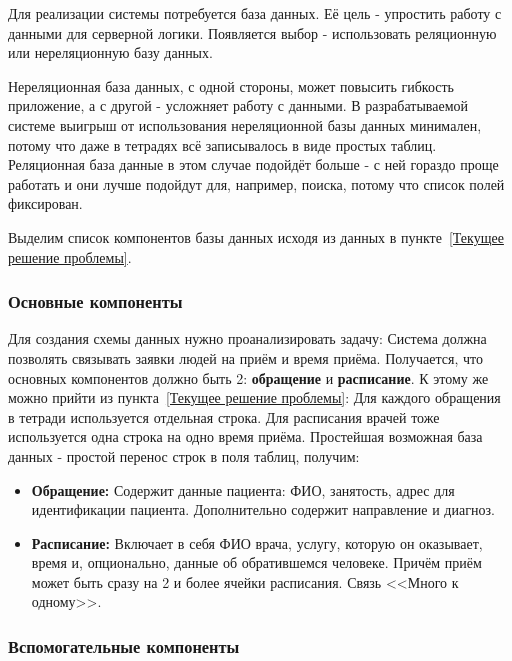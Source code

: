 \documentclass[a4paper,article]{article}
\begin{document}
    Для реализации системы потребуется база данных. Её цель - упростить работу с данными для серверной логики. Появляется выбор - использовать реляционную или нереляционную базу данных.

    Нереляционная база данных, с одной стороны, может повысить гибкость приложение, а с другой - усложняет работу с данными. В разрабатываемой системе выигрыш от использования нереляционной базы данных минимален, потому что даже в тетрадях всё записывалось в виде простых таблиц. Реляционная база данные в этом случае подойдёт больше - с ней гораздо проще работать и они лучше подойдут для, например, поиска, потому что список полей фиксирован.

    Выделим список компонентов базы данных исходя из данных в пункте~\ref{Текущее решение проблемы}.

    \subsubsection{Основные компоненты}\label{Проектирование БД. Основные компоненты}

    Для создания схемы данных нужно проанализировать задачу: Система должна позволять связывать заявки людей на приём и время приёма. Получается, что основных компонентов должно быть 2: \textbf{обращение} и \textbf{расписание}. К этому же можно прийти из пункта~\ref{Текущее решение проблемы}: Для каждого обращения в тетради используется отдельная строка. Для расписания врачей тоже используется одна строка на одно время приёма. Простейшая возможная база данных - простой перенос строк в поля таблиц, получим:

    \begin{itemize}[nolistsep]
        \item \textbf{Обращение:} Содержит данные пациента: ФИО, занятость, адрес для идентификации пациента. Дополнительно содержит направление и диагноз.
        \item \textbf{Расписание:} Включает в себя ФИО врача, услугу, которую он оказывает, время и, опционально, данные об обратившемся человеке. Причём приём может быть сразу на 2 и более ячейки расписания. Связь <<Много к одному>>.
    \end{itemize}

    \subsubsection{Вспомогательные компоненты}\label{Проектирование БД. Вспомогательные компоненты}
\end{document}
